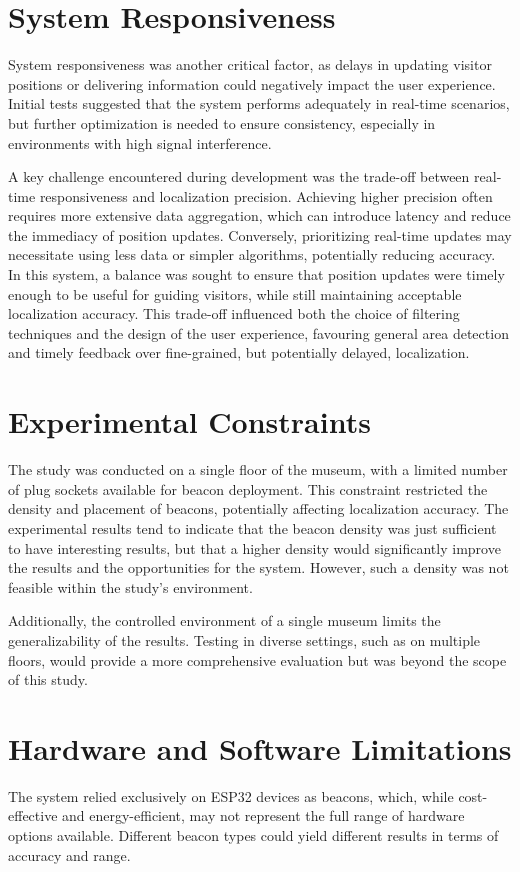 \section{System Responsiveness}

System responsiveness was another critical factor, as delays in updating visitor positions or delivering information could negatively impact the user experience. Initial tests suggested that the system performs adequately in real-time scenarios, but further optimization is needed to ensure consistency, especially in environments with high signal interference.

A key challenge encountered during development was the trade-off between real-time responsiveness and localization precision. Achieving higher precision often requires more extensive data aggregation, which can introduce latency and reduce the immediacy of position updates. Conversely, prioritizing real-time updates may necessitate using less data or simpler algorithms, potentially reducing accuracy. In this system, a balance was sought to ensure that position updates were timely enough to be useful for guiding visitors, while still maintaining acceptable localization accuracy. This trade-off influenced both the choice of filtering techniques and the design of the user experience, favouring general area detection and timely feedback over fine-grained, but potentially delayed, localization.

\section{Experimental Constraints}
The study was conducted on a single floor of the museum, with a limited number of plug sockets available for beacon deployment. This constraint restricted the density and placement of beacons, potentially affecting localization accuracy. The experimental results tend to indicate that the beacon density was just sufficient to have interesting results, but that a higher density would significantly improve the results and the opportunities for the system. However, such a density was not feasible within the study's environment.

Additionally, the controlled environment of a single museum limits the generalizability of the results. Testing in diverse settings, such as on multiple floors, would provide a more comprehensive evaluation but was beyond the scope of this study.

\section{Hardware and Software Limitations}
The system relied exclusively on ESP32 devices as beacons, which, while cost-effective and energy-efficient, may not represent the full range of hardware options available. Different beacon types could yield different results in terms of accuracy and range.

